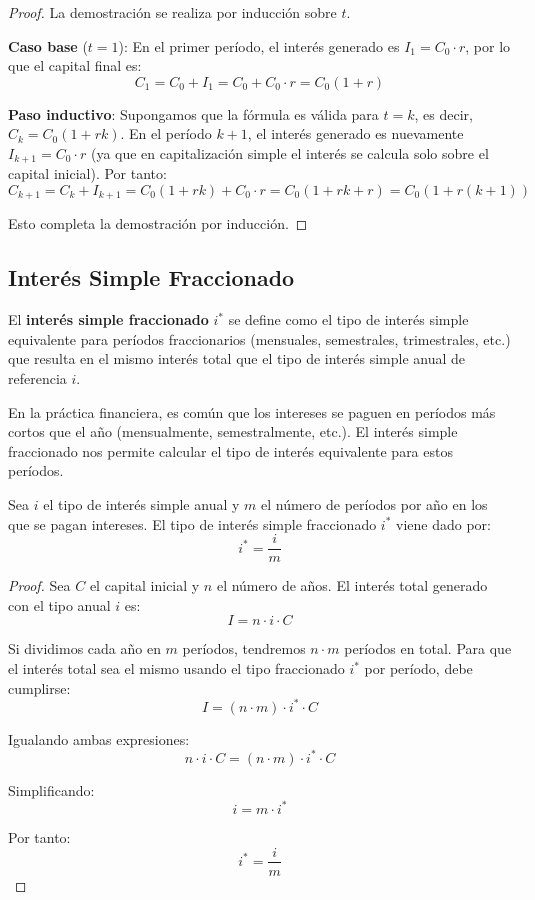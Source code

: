 \begin{proof}
La demostración se realiza por inducción sobre $t$.

\textbf{Caso base} ($t = 1$): En el primer período, el interés generado es $I_1 = C_0 \cdot r$, por lo que el capital final es:
$$C_1 = C_0 + I_1 = C_0 + C_0 \cdot r = C_0(1 + r)$$

\textbf{Paso inductivo}: Supongamos que la fórmula es válida para $t = k$, es decir, $C_k = C_0(1 + rk)$. En el período $k+1$, el interés generado es nuevamente $I_{k+1} = C_0 \cdot r$ (ya que en capitalización simple el interés se calcula solo sobre el capital inicial). Por tanto:
$$C_{k+1} = C_k + I_{k+1} = C_0(1 + rk) + C_0 \cdot r = C_0(1 + rk + r) = C_0(1 + r(k+1))$$

Esto completa la demostración por inducción.
\end{proof}

\subsection{Interés Simple Fraccionado}

\begin{definicion}
El \textbf{interés simple fraccionado} $i^*$ se define como el tipo de interés simple equivalente para períodos fraccionarios (mensuales, semestrales, trimestrales, etc.) que resulta en el mismo interés total que el tipo de interés simple anual de referencia $i$.
\end{definicion}

En la práctica financiera, es común que los intereses se paguen en períodos más cortos que el año (mensualmente, semestralmente, etc.). El interés simple fraccionado nos permite calcular el tipo de interés equivalente para estos períodos.

\begin{teorema}
Sea $i$ el tipo de interés simple anual y $m$ el número de períodos por año en los que se pagan intereses. El tipo de interés simple fraccionado $i^*$ viene dado por:
\begin{equation}
i^* = \frac{i}{m}
\end{equation}
\end{teorema}

\begin{proof}
Sea $C$ el capital inicial y $n$ el número de años. El interés total generado con el tipo anual $i$ es:
$$I = n \cdot i \cdot C$$

Si dividimos cada año en $m$ períodos, tendremos $n \cdot m$ períodos en total. Para que el interés total sea el mismo usando el tipo fraccionado $i^*$ por período, debe cumplirse:
$$I = (n \cdot m) \cdot i^* \cdot C$$

Igualando ambas expresiones:
$$n \cdot i \cdot C = (n \cdot m) \cdot i^* \cdot C$$

Simplificando:
$$i = m \cdot i^*$$

Por tanto:
$$i^* = \frac{i}{m}$$
\end{proof}


